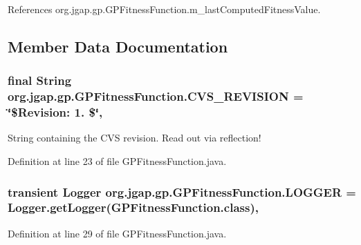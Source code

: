References org.\-jgap.\-gp.\-G\-P\-Fitness\-Function.\-m\-\_\-last\-Computed\-Fitness\-Value.



\subsection{Member Data Documentation}
\hypertarget{classorg_1_1jgap_1_1gp_1_1_g_p_fitness_function_a36b00280899ef716e0bd0bed8ef022df}{
\subsubsection[{C\-V\-S\-\_\-\-R\-E\-V\-I\-S\-I\-O\-N}]{\setlength{\rightskip}{0pt plus 5cm}final String org.\-jgap.\-gp.\-G\-P\-Fitness\-Function.\-C\-V\-S\-\_\-\-R\-E\-V\-I\-S\-I\-O\-N = \char`\"{}\$Revision\-: 1. \$\char`\"{}\hspace{0.3cm}{\ttfamily [static]}, {\ttfamily [private]}}}\label{classorg_1_1jgap_1_1gp_1_1_g_p_fitness_function_a36b00280899ef716e0bd0bed8ef022df}
String containing the C\-V\-S revision. Read out via reflection! 

Definition at line 23 of file G\-P\-Fitness\-Function.\-java.

\hypertarget{classorg_1_1jgap_1_1gp_1_1_g_p_fitness_function_af081b97905f11fa56ed54bada9cd1a51}{
\subsubsection[{L\-O\-G\-G\-E\-R}]{\setlength{\rightskip}{0pt plus 5cm}transient Logger org.\-jgap.\-gp.\-G\-P\-Fitness\-Function.\-L\-O\-G\-G\-E\-R = Logger.\-get\-Logger(G\-P\-Fitness\-Function.\-class)\hspace{0.3cm}{\ttfamily [static]}, {\ttfamily [private]}}}\label{classorg_1_1jgap_1_1gp_1_1_g_p_fitness_function_af081b97905f11fa56ed54bada9cd1a51}


Definition at line 29 of file G\-P\-Fitness\-Function.\-java.

